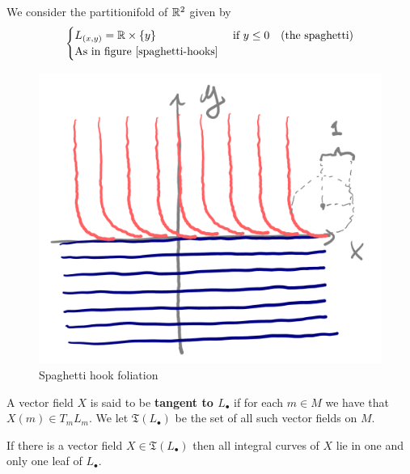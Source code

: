 	\begin{example}
		We consider the partitionifold of $\mathbb{R}^2$ given by
		$$
		\begin{cases}
			L_{(x,y)} = \mathbb{R} \times \{y\}            &\text{ if } y \leq 0 \quad \text{(the spaghetti)} \\
			\text{As in figure \ref{spaghetti-hooks}}
		\end{cases}
		$$
	\end{example}

    \begin{figure}[H]
        \centering
        \includegraphics[width=0.7\linewidth]{spaghetti-hook.png}
        \caption{Spaghetti hook foliation}
        \label{spaghetti-hooks}
    \end{figure}

    \begin{definition}
        A vector field $X$ is said to be \textbf{tangent to $L_\bullet$} if for each $m \in M$ we have that $X(m) \in T_m L_m$. We let $\mathfrak{T}(L_\bullet)$ be the set of all such vector fields on $M$.
    \end{definition}

    \begin{prop}
	   If there is a vector field $X \in \mathfrak{T}(L_\bullet)$ then all integral curves of $X$ lie in one and only one leaf of $L_\bullet$.
    \end{prop}

